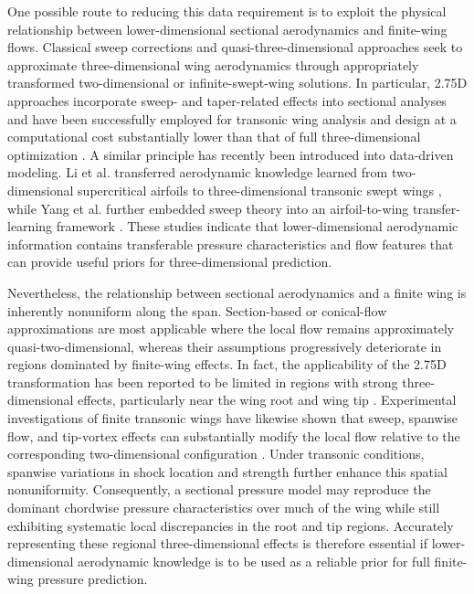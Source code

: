 One possible route to reducing this data requirement is to exploit the physical relationship between lower-dimensional sectional aerodynamics and finite-wing flows. Classical sweep corrections and quasi-three-dimensional approaches seek to approximate three-dimensional wing aerodynamics through appropriately transformed two-dimensional or infinite-swept-wing solutions. In particular, 2.75D approaches incorporate sweep- and taper-related effects into sectional analyses and have been successfully employed for transonic wing analysis and design at a computational cost substantially lower than that of full three-dimensional optimization \cite{Zhao2016SupercriticalWing,Xu2022Improved275D}. A similar principle has recently been introduced into data-driven modeling. Li et al. transferred aerodynamic knowledge learned from two-dimensional supercritical airfoils to three-dimensional transonic swept wings \cite{Li2023AirfoilToWing}, while Yang et al. further embedded sweep theory into an airfoil-to-wing transfer-learning framework \cite{Yang2025PhysicsEmbeddedTransfer}. These studies indicate that lower-dimensional aerodynamic information contains transferable pressure characteristics and flow features that can provide useful priors for three-dimensional prediction.

Nevertheless, the relationship between sectional aerodynamics and a finite wing is inherently nonuniform along the span. Section-based or conical-flow approximations are most applicable where the local flow remains approximately quasi-two-dimensional, whereas their assumptions progressively deteriorate in regions dominated by finite-wing effects. In fact, the applicability of the 2.75D transformation has been reported to be limited in regions with strong three-dimensional effects, particularly near the wing root and wing tip \cite{Xu2022Improved275D}. Experimental investigations of finite transonic wings have likewise shown that sweep, spanwise flow, and tip-vortex effects can substantially modify the local flow relative to the corresponding two-dimensional configuration \cite{DAguanno2022FiniteWing}. Under transonic conditions, spanwise variations in shock location and strength further enhance this spatial nonuniformity. Consequently, a sectional pressure model may reproduce the dominant chordwise pressure characteristics over much of the wing while still exhibiting systematic local discrepancies in the root and tip regions. Accurately representing these regional three-dimensional effects is therefore essential if lower-dimensional aerodynamic knowledge is to be used as a reliable prior for full finite-wing pressure prediction.

